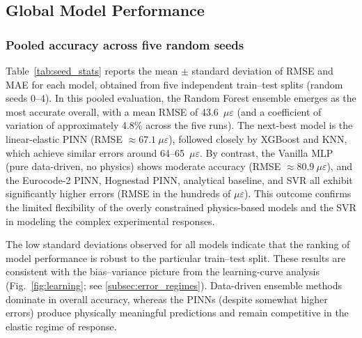 \documentclass{article}
\begin{document}
\subsection{Global Model Performance}
\label{sec:global_performance}

\subsubsection{Pooled accuracy across five random seeds}
Table~\ref{tab:seed_stats} reports the mean $\pm$ standard deviation of RMSE and MAE for each model, obtained from five independent train–test splits (random seeds 0–4). In this pooled evaluation, the Random Forest ensemble emerges as the most accurate overall, with a mean RMSE of 43.6~$\mu\varepsilon$ (and a coefficient of variation of approximately 4.8\% across the five runs). The next-best model is the linear-elastic PINN (RMSE $\approx 67.1~\mu\varepsilon$), followed closely by XGBoost and KNN, which achieve similar errors around 64–65~$\mu\varepsilon$. By contrast, the Vanilla MLP (pure data-driven, no physics) shows moderate accuracy (RMSE $\approx 80.9~\mu\varepsilon$), and the Eurocode-2 PINN, Hognestad PINN, analytical baseline, and SVR all exhibit significantly higher errors (RMSE in the hundreds of $\mu\varepsilon$). This outcome confirms the limited flexibility of the overly constrained physics-based models and the SVR in modeling the complex experimental responses.

The low standard deviations observed for all models indicate that the ranking of model performance is robust to the particular train–test split. These results are consistent with the bias–variance picture from the learning-curve analysis
(Fig.~\ref{fig:learning}; see \cref{subsec:error_regimes}). Data-driven ensemble methods dominate in overall accuracy, whereas the PINNs (despite somewhat higher errors) produce physically meaningful predictions and remain competitive in the elastic regime of response.
\end{document}
